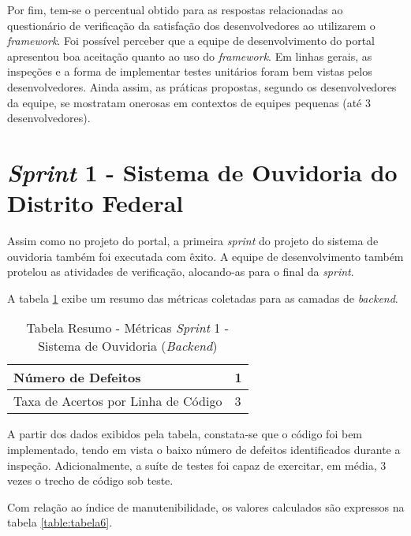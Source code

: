 Por fim, tem-se o percentual obtido para as respostas relacionadas ao questionário de verificação da satisfação dos desenvolvedores ao utilizarem o \textit{framework}. Foi possível perceber que a equipe de desenvolvimento do portal apresentou boa aceitação quanto ao uso do \textit{framework}. Em linhas gerais, as inspeções e a forma de implementar testes unitários foram bem vistas pelos desenvolvedores. Ainda assim, as práticas propostas, segundo os desenvolvedores da equipe, se mostratam onerosas em contextos de equipes pequenas (até 3 desenvolvedores). 

\clearpage

\section{\textit{Sprint} 1 - Sistema de Ouvidoria do Distrito Federal}

Assim como no projeto do portal, a primeira \textit{sprint} do projeto do sistema de ouvidoria também foi executada com êxito. A equipe de desenvolvimento também protelou as atividades de verificação, alocando-as para o final da \textit{sprint}.

A tabela \ref{table:tabela5} exibe um resumo das métricas coletadas para as camadas de \textit{backend}.

\begin{table}[h]
\centering
\begin{tabular}{ | m{8cm} | m{8cm} | } 
\hline
Número de Defeitos & 1 \\ 
\hline
Taxa de Acertos por Linha de Código & 3 \\ 
\hline
\end{tabular}
\caption{Tabela Resumo - Métricas \textit{Sprint} 1 - Sistema de Ouvidoria (\textit{Backend})}
\label{table:tabela5}
\end{table}

A partir dos dados exibidos pela tabela, constata-se que o código foi bem implementado, tendo em vista o baixo número de defeitos identificados durante a inspeção. Adicionalmente, a suíte de testes foi capaz de exercitar, em média, 3 vezes o trecho de código sob teste.

Com relação ao índice de manutenibilidade, os valores calculados são expressos na tabela \ref{table:tabela6}.

